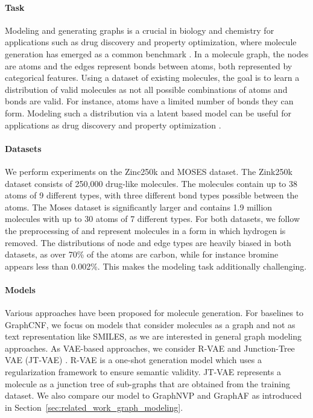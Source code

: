 \paragraph{Task} Modeling and generating graphs is a crucial in biology and chemistry for applications such as drug discovery and property optimization, where molecule generation has emerged as a common benchmark \cite{JunctionTreeVAE, GraphNVP, GraphAF}. 
In a molecule graph, the nodes are atoms and the edges represent bonds between atoms, both represented by categorical features. 
Using a dataset of existing molecules, the goal is to learn a distribution of valid molecules as not all possible combinations of atoms and bonds are valid.
For instance, atoms have a limited number of bonds they can form. 
Modeling such a distribution via a latent based model can be useful for applications as drug discovery and property optimization \cite{GraphAF, MolecularRNN}. 

\paragraph{Datasets} We perform experiments on the Zinc250k \cite{Zinc250k} and MOSES \cite{MosesDataset} dataset. 
The Zink250k dataset consists of 250,000 drug-like molecules. The molecules contain up to 38 atoms of 9 different types, with three different bond types possible between the atoms. 
The Moses dataset is significantly larger and contains 1.9 million molecules with up to 30 atoms of 7 different types. 
For both datasets, we follow the preprocessing of \citet{GraphAF} and represent molecules in a form in which hydrogen is removed. 
The distributions of node and edge types are heavily biased in both datasets, as over 70\% of the atoms are carbon, while for instance bromine appears less than 0.002\%. 
This makes the modeling task additionally challenging.

\paragraph{Models} Various approaches have been proposed for molecule generation. 
For baselines to GraphCNF, we focus on models that consider molecules as a graph and not as text representation like SMILES, as we are interested in general graph modeling approaches. 
As VAE-based approaches, we consider R-VAE \cite{GraphVAEConstrained} and Junction-Tree VAE (JT-VAE) \cite{JunctionTreeVAE}. 
R-VAE is a one-shot generation model which uses a regularization framework to ensure semantic validity. 
JT-VAE represents a molecule as a junction tree of sub-graphs that are obtained from the training dataset. 
We also compare our model to GraphNVP \cite{GraphNVP} and GraphAF \cite{GraphAF} as introduced in Section~\ref{sec:related_work_graph_modeling}.

